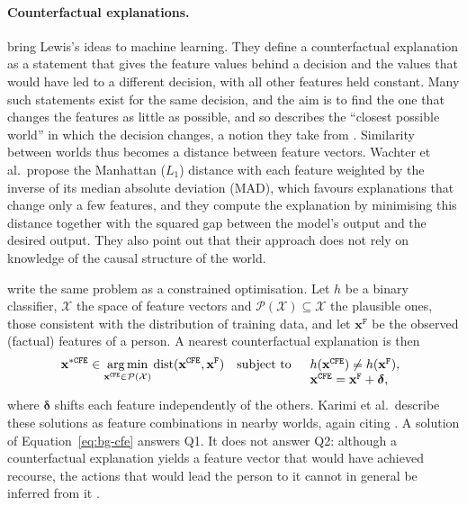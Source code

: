 \paragraph{Counterfactual explanations.}
\citet{wachter2017counterfactual} bring Lewis's ideas to machine learning. They define a
counterfactual explanation as a statement that gives the feature values behind a decision and the
values that would have led to a different decision, with all other features held constant. Many
such statements exist for the same decision, and the aim is to find the one that 
changes the features as little as
possible, and so describes the ``closest possible world'' in which the decision changes, a notion
they take from \citet{lewis1973counterfactuals}. Similarity between worlds thus becomes a distance
between feature vectors. Wachter et al.\ propose the Manhattan ($L_1$) distance with each feature
weighted by the inverse of its median absolute deviation (MAD), which favours explanations that change
only a few features, and they compute the explanation by minimising this distance together with
the squared gap between the model's output and the desired output. They also point out that their
approach does not rely on knowledge of the causal structure of the world.

\citet{karimi2022survey} write the same problem as a constrained optimisation. Let $h$ be a binary
classifier, $\mathcal{X}$ the space of feature vectors and $\mathcal{P}(\mathcal{X}) \subseteq
\mathcal{X}$ the plausible ones, those consistent with the distribution of training data, and let
$\mathbf{x}^{\mathtt{F}}$ be the observed (factual) features of a person. A nearest counterfactual
explanation is then
\begin{equation}
  \mathbf{x}^{*\mathtt{CFE}} \in \mathop{\mathrm{arg\,min}}_{\mathbf{x}^{\mathtt{CFE}} \in
  \mathcal{P}(\mathcal{X})} \mathrm{dist}(\mathbf{x}^{\mathtt{CFE}}, \mathbf{x}^{\mathtt{F}})
  \quad \mbox{subject to} \quad
  \begin{array}[t]{l}
    h(\mathbf{x}^{\mathtt{CFE}}) \neq h(\mathbf{x}^{\mathtt{F}}), \\
    \mathbf{x}^{\mathtt{CFE}} = \mathbf{x}^{\mathtt{F}} + \boldsymbol{\delta},
  \end{array}  
  \label{eq:bg-cfe}
\end{equation}  
where $\boldsymbol{\delta}$ shifts each feature independently of the others. Karimi et al.\
describe these solutions as feature combinations in nearby worlds, again citing
\citet{lewis1973counterfactuals}. A solution of Equation~\ref{eq:bg-cfe} answers Q1. It does not answer Q2: 
although a counterfactual explanation yields a feature vector that would have achieved recourse, 
the actions that would lead the person to it cannot in general be 
inferred from it \cite{karimi2021algorithmic}.

